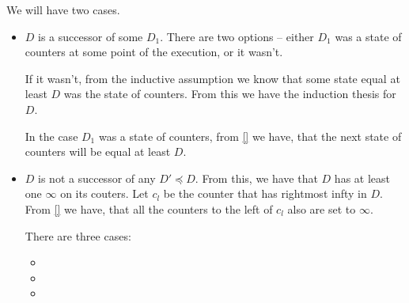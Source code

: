 We will have two cases. 
\begin{itemize}
\item $D$ is a successor of some $D_1$. 
There are two options -- either $D_1$ was a state of counters 
at some point of the execution, or it wasn't. 

If it wasn't, from the inductive assumption we know 
that some state equal at least $D$ was the state of counters. From this we have the induction 
thesis for $D$.

In the case $D_1$ was a state of counters, from \ref{} we have, that the next 
state of counters will be equal at least $D$.  




% 


\item $D$ is not a successor of any $D' \preceq D$. From this, we have that $D$ has at least one 
$\infty$ on its couters.  
Let $c_l$ be the counter that has rightmost infty in $D$. 
From \ref{} we have, that all the counters to the left of $c_l$ also are set to $\infty$.

There are three cases:
\begin{itemize}
\item 
\item
\item
\end{itemize}



\end{itemize}

